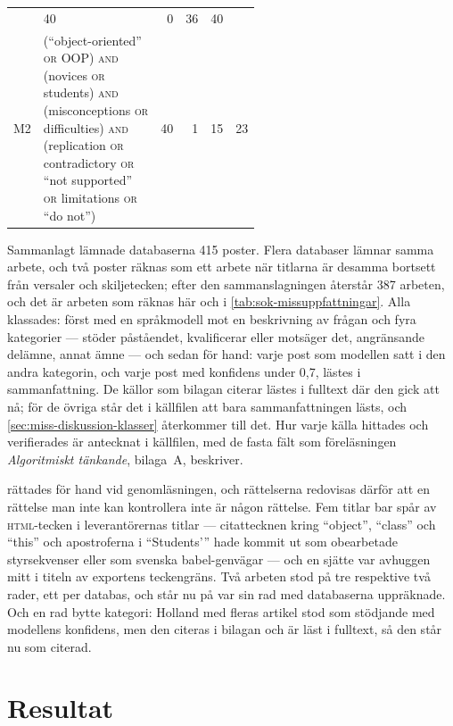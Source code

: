 \begin{table}[!htb]
\begin{tabular}{@{}lp{0.55\linewidth}rrrr@{}}
       & 40 & 0 & 36 & 40 \\
    M2 & (\enquote{object-oriented} \textsc{or} OOP) \textsc{and} (novices \textsc{or} students) \textsc{and} (misconceptions \textsc{or} difficulties) \textsc{and} (replication \textsc{or} contradictory \textsc{or} \enquote{not supported} \textsc{or} limitations \textsc{or} \enquote{do not})
       & 40 & 1 & 15 & 23 \\
    \bottomrule
  \end{tabular}
\end{table}

Sammanlagt lämnade databaserna 415 poster.  Flera databaser lämnar samma
arbete, och två poster räknas som ett arbete när titlarna är desamma
bortsett från versaler och skiljetecken; efter den sammanslagningen
återstår 387 arbeten, och det är arbeten som räknas här och i
\cref{tab:sok-missuppfattningar}.  Alla klassades: först med
en språkmodell mot en beskrivning av frågan och fyra kategorier ---
stöder påståendet, kvalificerar eller motsäger det, angränsande delämne,
annat ämne --- och sedan för hand: varje post som modellen satt i den
andra kategorin, och varje post med konfidens under 0,7, lästes i
sammanfattning.  De källor som bilagan citerar lästes i fulltext där
den gick att nå; för de övriga står det i källfilen att bara
sammanfattningen lästs, och \cref{sec:miss-diskussion-klasser} återkommer till
det.  Hur varje
källa hittades och verifierades är antecknat i källfilen, med de fasta
fält som föreläsningen \emph{Algoritmiskt tänkande}, bilaga~A,
beskriver.

 rättades för hand vid genomläsningen,
och rättelserna redovisas därför att en rättelse man inte kan
kontrollera inte är någon rättelse.  Fem titlar bar spår av
\textsc{html}-tecken i leverantörernas titlar --- citattecknen kring
\enquote{object}, \enquote{class} och \enquote{this} och apostroferna i
\enquote{Students'} hade kommit ut som obearbetade styrsekvenser eller
som svenska babel-genvägar --- och en sjätte var avhuggen mitt i titeln
av exportens teckengräns.  Två arbeten stod på tre respektive två rader,
ett per databas, och står nu på var sin rad med databaserna uppräknade.
Och en rad bytte kategori: Holland med fleras artikel stod som stödjande
med modellens konfidens, men den citeras i bilagan och är läst i
fulltext, så den står nu som citerad.

\section{Resultat}
\label{sec:miss-resultat-klasser}

